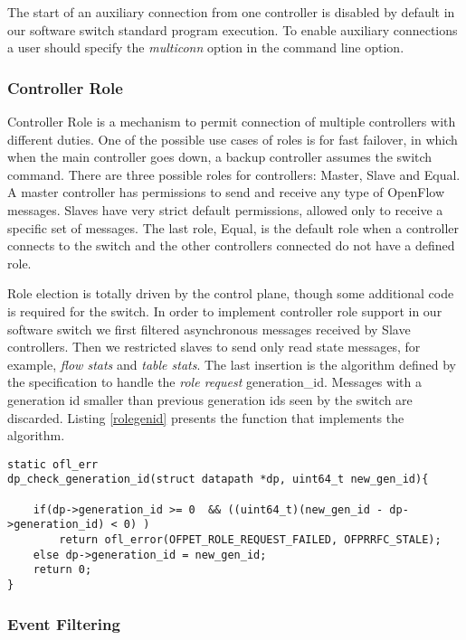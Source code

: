     The start of an auxiliary connection from one controller is disabled by default in our software switch standard program execution. To enable auxiliary connections a user should specify the \textit{multiconn} option in the command line option.   

    \subsubsection{Controller Role}

    Controller Role is a mechanism to permit connection of multiple controllers with different duties. One of the possible use cases of roles is for fast failover, in which when the main controller goes down, a backup controller assumes the switch command. There are three possible roles for controllers: Master, Slave and Equal. A master controller has permissions to send and receive any type of OpenFlow messages. Slaves have very strict default permissions, allowed only to receive a specific set of messages. The last role, Equal, is the default role when a controller connects to the switch and the other controllers connected do not have a defined role.
    
    Role election is totally driven by the control plane, though some additional code is required for the switch. In order to implement controller role support in our software switch we first filtered asynchronous messages received by Slave controllers. Then we restricted slaves to send only read state messages, for example, \textit{flow stats} and \textit{table stats}. The last insertion is the algorithm defined by the specification to handle the \textit{role request} generation_id. Messages with a generation id smaller than previous generation ids seen by the switch are discarded. Listing \ref{rolegenid} presents the function that implements the algorithm.
\pagebreak
\begin{lstlisting}[caption={Ethernet parsing in the nbee_link module}, label=rolegenid,]
static ofl_err
dp_check_generation_id(struct datapath *dp, uint64_t new_gen_id){

    if(dp->generation_id >= 0  && ((uint64_t)(new_gen_id - dp->generation_id) < 0) )
        return ofl_error(OFPET_ROLE_REQUEST_FAILED, OFPRRFC_STALE);
    else dp->generation_id = new_gen_id;
    return 0;
}
\end{lstlisting} 
    \subsubsection{Event Filtering}

